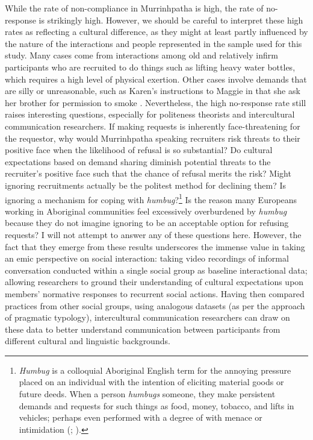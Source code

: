 \documentclass[output=paper,nonflat,colorlinks,citecolor=brown]{langsci/langscibook}
\begin{document}
While the rate of non-compliance in Murrinhpatha is high, the rate of no-response is strikingly high. However, we should be careful to interpret these high rates as reflecting a cultural difference, as they might at least partly influenced by the nature of the interactions and people represented in the sample used for this study. Many cases come from interactions among old and relatively infirm participants who are recruited to do things such as lifting heavy water bottles, which requires a high level of physical exertion. Other cases involve demands that are silly or unreasonable, such as Karen’s instructions to Maggie in  that she ask her brother for permission to smoke \citep{BlytheUnpublished}. Nevertheless, the high no-response rate still raises interesting questions, especially for politeness theorists and intercultural communication researchers. If making requests is inherently face-threatening for the requestor, why would Murrinhpatha speaking recruiters risk threats to their positive face when the likelihood of refusal is so substantial? Do cultural expectations based on demand sharing \citep{Peterson1993} diminish potential threats to the recruiter’s positive face such that the chance of refusal merits the risk? Might ignoring recruitments actually be the politest method for declining them? Is ignoring a mechanism for coping with \textit{humbug}?\footnote{\textit{Humbug} is a colloquial Aboriginal English term for the annoying pressure placed on an individual with the intention of eliciting material goods or future deeds. When a person \textit{humbugs} someone, they make persistent demands and requests for such things as food, money, tobacco, and lifts in vehicles; perhaps even performed with a degree of with menace or intimidation (\citealt{Gerrard1989}; \citealt[40–42]{Blythe2001}).} Is the reason many Europeans working in Aboriginal communities feel excessively overburdened by \textit{humbug} \citep{Gerrard1989} because they do not imagine ignoring to be an acceptable option for refusing requests? I will not attempt to answer any of these questions here. However, the fact that they emerge from these results underscores the immense value in taking an emic perspective on social interaction: taking video recordings of informal conversation conducted within a single social group as baseline interactional data; allowing researchers to ground their understanding of cultural expectations upon members’ normative responses to recurrent social actions. Having then compared practices from other social groups, using analogous datasets (as per the approach of pragmatic typology), intercultural communication researchers can draw on these data to better understand communication between participants from different cultural and linguistic backgrounds.
\end{document}

